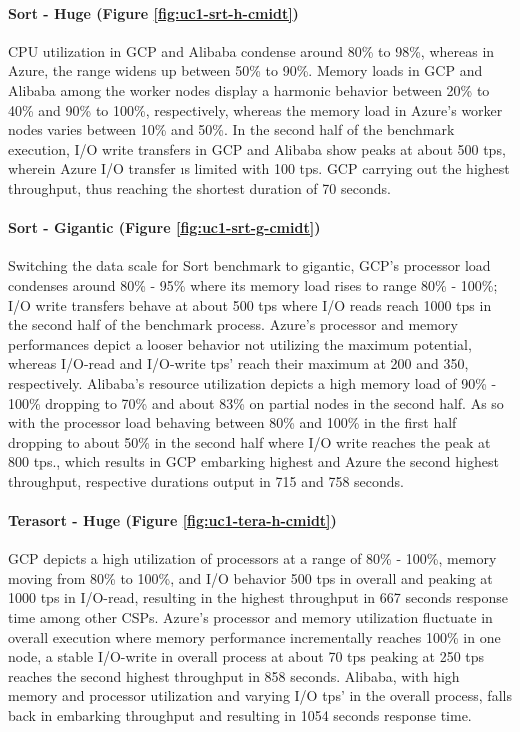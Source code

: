 \documentclass[review]{elsarticle}
\begin{document}
\paragraph{Sort - Huge (Figure \ref{fig:uc1-srt-h-cmidt})}CPU utilization in GCP and Alibaba condense around 80\% to 98\%, whereas in Azure, the range widens up between 50\% to 90\%. Memory loads in GCP and Alibaba among the worker nodes display a harmonic behavior between 20\% to 40\% and 90\% to 100\%, respectively, whereas the memory load in Azure's worker nodes varies between 10\% and 50\%. In the second half of the benchmark execution, I/O write transfers in GCP and Alibaba show peaks at about 500 tps, wherein Azure I/O transfer ıs limited with 100 tps. GCP carrying out the highest throughput, thus reaching the shortest duration of 70 seconds.

\paragraph{Sort - Gigantic (Figure \ref{fig:uc1-srt-g-cmidt})}Switching the data scale for Sort benchmark to gigantic, GCP's processor load condenses around 80\% - 95\% where its memory load rises to range 80\% - 100\%; I/O write transfers behave at about 500 tps where I/O reads reach 1000 tps in the second half of the benchmark process. Azure's processor and memory performances depict a looser behavior not utilizing the maximum potential, whereas I/O-read and I/O-write tps' reach their maximum at 200 and 350, respectively. Alibaba's resource utilization depicts a high memory load of 90\% - 100\% dropping to 70\% and about 83\% on partial nodes in the second half. As so with the processor load behaving between 80\% and 100\% in the first half dropping to about 50\% in the second half where I/O write reaches the peak at 800 tps., which results in GCP embarking highest and Azure the second highest throughput, respective durations output in 715 and 758 seconds.

\paragraph{Terasort - Huge (Figure \ref{fig:uc1-tera-h-cmidt})}GCP depicts a high utilization of processors at a range of 80\% - 100\%, memory moving from 80\% to 100\%, and I/O behavior 500 tps in overall and peaking at 1000 tps in I/O-read, resulting in the highest throughput in 667 seconds response time among other CSPs. Azure's processor and memory utilization fluctuate in overall execution where memory performance incrementally reaches 100\% in one node, a stable I/O-write in overall process at about 70 tps peaking at 250 tps reaches the second highest throughput in 858 seconds. Alibaba, with high memory and processor utilization and varying I/O tps' in the overall process, falls back in embarking throughput and resulting in 1054 seconds response time.
\end{document}
